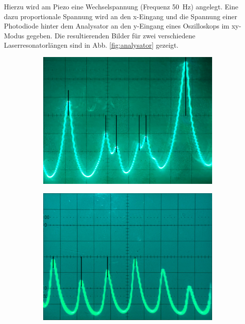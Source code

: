\documentclass{article}
\begin{document}
Hierzu wird am Piezo eine Wechselspannung (Frequenz \SI{50}{\Hz}) angelegt.
Eine dazu proportionale Spannung wird an den x-Eingang und die Spannung einer Photodiode hinter
dem Analysator an den y-Eingang eines Oszilloskops im xy-Modus gegeben.
Die resultierenden Bilder für zwei verschiedene Laserresonatorlängen sind in Abb. \ref{fig:analysator} gezeigt.
\begin{figure}[h]
  \centering
  \begin{subfigure}{0.49\textwidth}
    \centering
    \includegraphics[width=\textwidth]{analysator-kurz}
    \label{fig:analysator-kurz}
  \end{subfigure}
  \hfill
  \begin{subfigure}{0.49\textwidth}
    \centering
    \includegraphics[width=\textwidth]{analysator-lang}

\end{subfigure}
\end{figure}
\end{document}
